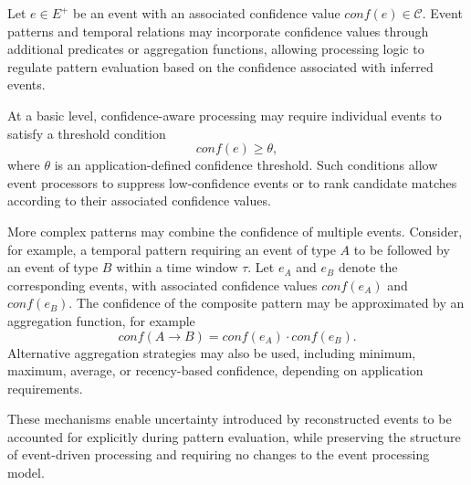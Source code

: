 Let $e \in E^{+}$ be an event with an associated confidence value $conf(e) \in \mathcal{C}$. Event patterns and temporal relations may incorporate confidence values through additional predicates or aggregation functions, allowing processing logic to regulate pattern evaluation based on the confidence associated with inferred events.

At a basic level, confidence-aware processing may require individual events to satisfy a threshold condition
\begin{equation}
conf(e) \ge \theta ,
\end{equation}
\noindent
where $\theta$ is an application-defined confidence threshold. Such conditions allow event processors to suppress low-confidence events or to rank candidate matches according to their associated confidence values.

More complex patterns may combine the confidence of multiple events. Consider, for example, a temporal pattern requiring an event of type $A$ to be followed by an event of type $B$ within a time window $\tau$. Let $e_A$ and $e_B$ denote the corresponding events, with associated confidence values $conf(e_A)$ and $conf(e_B)$. The confidence of the composite pattern may be approximated by an aggregation function, for example
\begin{equation}
conf(A \rightarrow B) = conf(e_A) \cdot conf(e_B).
\end{equation}
Alternative aggregation strategies may also be used, including minimum, maximum, average, or recency-based confidence, depending on application requirements.

These mechanisms enable uncertainty introduced by reconstructed events to be accounted for explicitly during pattern evaluation, while preserving the structure of event-driven processing and requiring no changes to the event processing model. 

